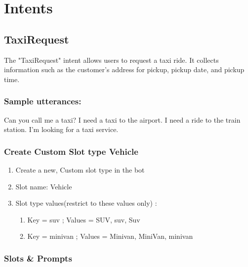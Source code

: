 \section{Intents}
\subsection{TaxiRequest}
The "TaxiRequest" intent allows users to request a taxi ride. It collects information such as the customer's address for pickup, pickup date, and pickup time.
\subsubsection{Sample utterances: }
Can you call me a taxi? \newline
I need a taxi to the airport.\newline
I need a ride to the train station.\newline
I'm looking for a taxi service.\newline

\subsubsection{Create Custom Slot type Vehicle}
\begin{enumerate}
    \item Create a new, Custom slot type in the bot
    \item Slot name: Vehicle
    \item Slot type values(restrict to these values only) : 
    \begin{enumerate}
        \item Key = suv ; Values = SUV, suv, Suv
        \item Key = minivan ; Values =  Minivan, MiniVan, minivan
    \end{enumerate}
\end{enumerate}

\subsubsection{Slots \& Prompts }

